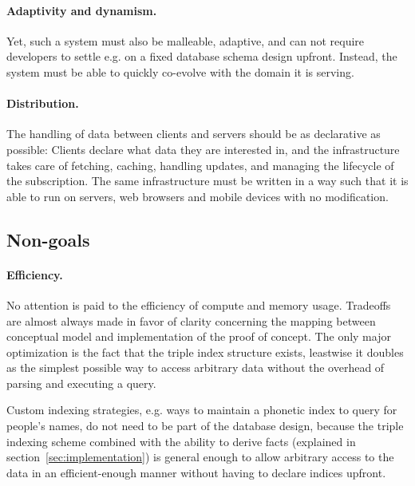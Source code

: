 \paragraph{Adaptivity and dynamism.} Yet, such a system must also be malleable, adaptive, and can not require developers to settle e.g. on a fixed database schema design upfront. Instead, the system must be able to quickly co-evolve with the domain it is serving.


\paragraph{Distribution.}
The handling of data between clients and servers should be as declarative as possible: Clients declare what data they are interested in, and the infrastructure takes care of fetching, caching, handling updates, and managing the lifecycle of the subscription. The same infrastructure must be written in a way such that it is able to run on servers, web browsers and mobile devices with no modification.


\subsection{Non-goals}\label{sec:nongoals}


\paragraph{Efficiency.}
No attention is paid to the efficiency of compute and memory usage. Tradeoffs are almost always made in favor of clarity concerning the mapping between conceptual model and implementation of the proof of concept. The only major optimization is the fact that the triple index structure exists, leastwise it doubles as the simplest possible way to access arbitrary data without the overhead of parsing and executing a query.

Custom indexing strategies, e.g. ways to maintain a phonetic index to query for people's names, do not need to be part of the database design, because the triple indexing scheme combined with the ability to derive facts (explained in section~\ref{sec:implementation}) is general enough to allow arbitrary access to the data in an efficient-enough manner without having to declare indices upfront.

